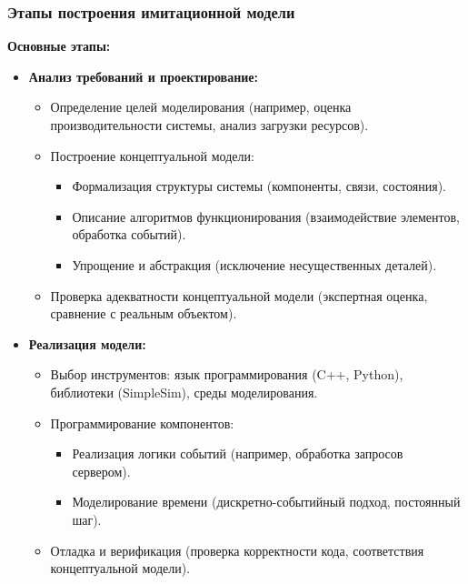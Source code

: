 \subsubsection*{Этапы построения имитационной модели}
\textbf{Основные этапы:}
\begin{itemize}
    \item \textbf{Анализ требований и проектирование:}
        \begin{itemize}
            \item Определение целей моделирования (например, оценка производительности системы, анализ загрузки ресурсов).
            \item Построение концептуальной модели:
                \begin{itemize}
                    \item Формализация структуры системы (компоненты, связи, состояния).
                    \item Описание алгоритмов функционирования (взаимодействие элементов, обработка событий).
                    \item Упрощение и абстракция (исключение несущественных деталей).
                \end{itemize}
            \item Проверка адекватности концептуальной модели (экспертная оценка, сравнение с реальным объектом).
        \end{itemize}

    \item \textbf{Реализация модели:}
        \begin{itemize}
            \item Выбор инструментов: язык программирования (C++, Python), библиотеки (SimpleSim), среды моделирования.
            \item Программирование компонентов:
                \begin{itemize}
                    \item Реализация логики событий (например, обработка запросов сервером).
                    \item Моделирование времени (дискретно-событийный подход, постоянный шаг).
                \end{itemize}
            \item Отладка и верификация (проверка корректности кода, соответствия концептуальной модели).
        \end{itemize}


\end{itemize}
